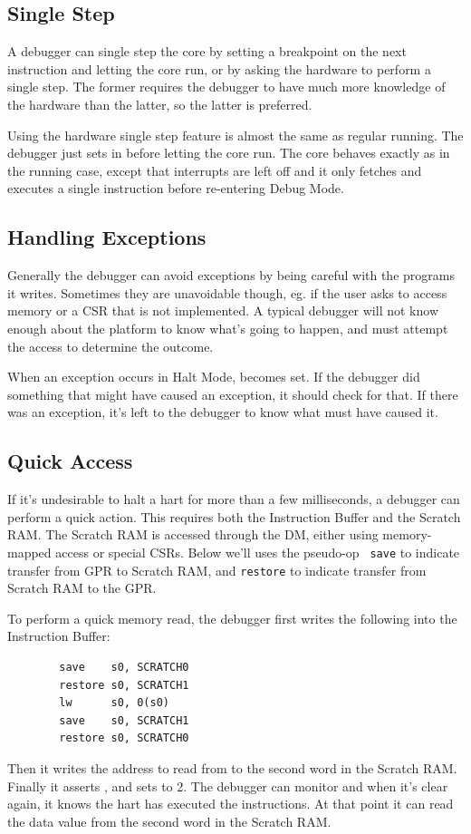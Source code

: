 \documentclass{article}
\begin{document}
\subsection{Single Step}

A debugger can single step the core by setting a breakpoint on the next
instruction and letting the core run, or by asking the hardware to perform a
single step. The former requires the debugger to have much more knowledge of
the hardware than the latter, so the latter is preferred.

Using the hardware single step feature is almost the same as regular running.
The debugger just sets \Fstep in \Rdcsr before letting the core run. The core
behaves exactly as in the running case, except that interrupts are left off and
it only fetches and executes a single instruction before re-entering Debug
Mode.

\subsection{Handling Exceptions}

Generally the debugger can avoid exceptions by being careful with the programs
it writes. Sometimes they are unavoidable though, eg. if the user asks to
access memory or a CSR that is not implemented. A typical debugger will not
know enough about the platform to know what's going to happen, and must attempt
the access to determine the outcome.

When an exception occurs in Halt Mode, \Fhmexc becomes set. If the debugger did
something that might have caused an exception, it should check for that. If
there was an exception, it's left to the debugger to know what must have caused
it.

\subsection{Quick Access} \label{quickaccess}

If it's undesirable to halt a hart for more than a few milliseconds, a debugger
can perform a quick action. This requires both the Instruction Buffer and the
Scratch RAM. The Scratch RAM is accessed through the DM, either using
memory-mapped access or special CSRs.  Below we'll uses the pseudo-op {\tt
save} to indicate transfer from GPR to Scratch RAM, and {\tt restore} to
indicate transfer from Scratch RAM to the GPR.

To perform a quick memory read, the debugger first writes the following into the
Instruction Buffer:
\begin{verbatim}
        save    s0, SCRATCH0
        restore s0, SCRATCH1
        lw      s0, 0(s0)
        save    s0, SCRATCH1
        restore s0, SCRATCH0
\end{verbatim}
Then it writes the address to read from to the second word in the Scratch RAM.
Finally it asserts \Fibufenable, and sets \Fibufaction to 2. The debugger can
monitor \Fibufenable and when it's clear again, it knows the hart has executed
the instructions. At that point it can read the data value from the second word
in the Scratch RAM.
\end{document}
